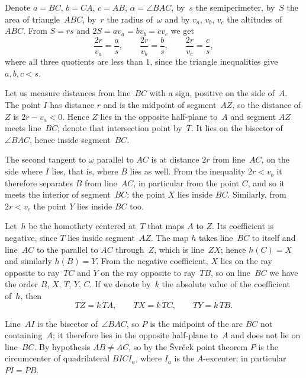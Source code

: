 {    Denote $a = BC$, $b = CA$, $c = AB$, $\alpha = \angle BAC$, by~$s$ the semiperimeter, by~$S$ the area of triangle~$ABC$, by~$r$ the radius of~$\omega$ and by $v_a$, $v_b$, $v_c$ the altitudes of $ABC$. From $S = rs$ and $2S = a v_a = b v_b = c v_c$ we get
    $$
    \frac{2r}{v_a} = \frac{a}{s}, \qquad \frac{2r}{v_b} = \frac{b}{s}, \qquad \frac{2r}{v_c} = \frac{c}{s},
    $$
    where all three quotients are less than $1$, since the triangle inequalities give $a, b, c < s$.

    Let us measure distances from line~$BC$ with a sign, positive on the side of~$A$. The point $I$ has distance $r$ and is the midpoint of segment~$AZ$, so the distance of $Z$ is $2r - v_a < 0$. Hence $Z$ lies in the opposite half-plane to~$A$ and segment $AZ$ meets line~$BC$; denote that intersection point by~$T$. It lies on the bisector of~$\angle BAC$, hence inside segment~$BC$.

    The second tangent to $\omega$ parallel to $AC$ is at distance $2r$ from line~$AC$, on the side where $I$ lies, that is, where $B$ lies as well. From the inequality $2r < v_b$ it therefore separates $B$ from line~$AC$, in particular from the point $C$, and so it meets the interior of segment~$BC$: the point $X$ lies inside $BC$. Similarly, from $2r < v_c$ the point $Y$ lies inside $BC$ too.

    Let~$h$ be the homothety centered at~$T$ that maps $A$ to $Z$. Its coefficient is negative, since $T$ lies inside segment~$AZ$. The map $h$ takes line~$BC$ to itself and line~$AC$ to the parallel to $AC$ through~$Z$, which is line~$ZX$; hence $h(C) = X$ and similarly $h(B) = Y$. From the negative coefficient, $X$ lies on the ray opposite to ray~$TC$ and $Y$ on the ray opposite to ray~$TB$, so on line~$BC$ we have the order $B$, $X$, $T$, $Y$, $C$. If we denote by~$k$ the absolute value of the coefficient of~$h$, then
    $$
    TZ = k \, TA, \qquad TX = k \, TC, \qquad TY = k \, TB.
    $$

    Line~$AI$ is the bisector of~$\angle BAC$, so $P$ is the midpoint of the arc $BC$ not containing~$A$; it therefore lies in the opposite half-plane to~$A$ and does not lie on line~$BC$. By hypothesis $AB \neq AC$, so by the Švrček point theorem $P$ is the circumcenter of quadrilateral $BICI_a$, where $I_a$ is the $A$-excenter; in particular $PI = PB$.

}
